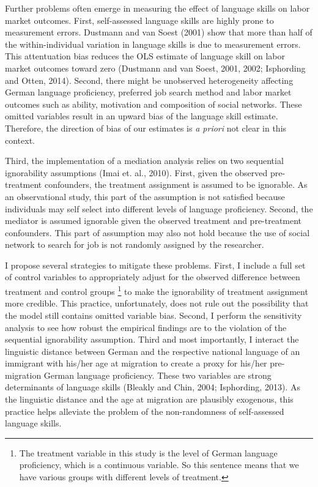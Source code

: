 \documentclass[12pt,a4paper]{article}
\begin{document}
Further problems often emerge in measuring the effect of language skills on labor market outcomes. First, self-assessed language skills are highly prone to measurement errors. Dustmann and van Soest (2001) show that more than half of the within-individual variation in language skills is due to measurement errors. This attentuation bias reduces the OLS estimate of language skill on labor market outcomes toward zero (Dustmann and van Soest, 2001, 2002; Isphording and Otten, 2014). Second, there might be unobserved heterogeneity affecting German language proficiency, preferred job search method and labor market outcomes such as ability, motivation and composition of social networks. These omitted variables result in an upward bias of the language skill estimate. Therefore, the direction of bias of our estimates is \textit{a priori} not clear in this context.

Third, the implementation of a mediation analysis relies on two sequential ignorability assumptions (Imai et. al., 2010). First, given the observed pre-treatment confounders, the treatment assignment is assumed to be ignorable. As an observational study, this part of the assumption is not satisfied because individuals may self select into different levels of language proficiency. Second, the mediator is assumed ignorable given the observed treatment and pre-treatment confounders. This part of assumption may also not hold because the use of social network to search for job is not randomly assigned by the researcher.

I propose several strategies to mitigate these problems. First, I include a full set of control variables to appropriately adjust for the observed difference between treatment and control groups \footnote {\tiny {The treatment variable in this study is the level of German language proficiency, which is a continuous variable. So this sentence means that we have various groups with different levels of treatment.}} to make the ignorability of treatment assignment more credible. This practice, unfortunately, does not rule out the possibility that the model still contains omitted variable bias. Second, I perform the sensitivity analysis to see how robust the empirical findings are to the violation of the sequential ignorability assumption. Third and most importantly, I interact the linguistic distance between German and the respective national language of an immigrant with his/her age at migration to create a proxy for his/her pre-migration German language proficiency. These two variables are strong determinants of language skills (Bleakly and Chin, 2004; Isphording, 2013). As the linguistic distance and the age at migration are plausibly exogenous, this practice helps alleviate the problem of the non-randomness of self-assessed language skills.
\end{document}
